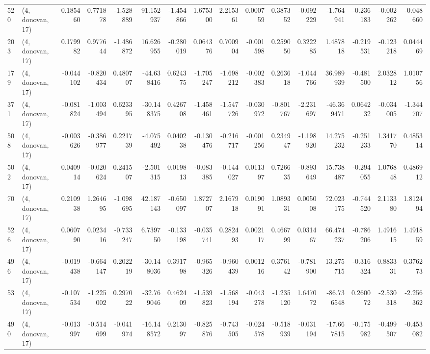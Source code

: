 \begin{tabular}{llrrrrrrrrrrrrrr}
520 &  (4, donovan, 17) &   0.185460 &  0.771878 & -1.528889 &   91.152937 & -1.454866 &   1.675300 &  2.215361 &  0.000759 &  0.387352 & -0.092229 &   -1.764941 & -0.236183 & -0.002262 & -0.048660 \\
203 &  (4, donovan, 17) &   0.179982 &  0.977644 & -1.486872 &   16.626955 & -0.280019 &   0.064376 &  0.700904 & -0.001598 &  0.259050 &  0.322285 &    1.487818 & -0.219531 & -0.123218 &  0.044469 \\
179 &  (4, donovan, 17) &  -0.044102 & -0.820434 &  0.480707 &  -44.638416 &  0.624375 &  -1.705247 & -1.698212 & -0.002383 &  0.263618 & -1.044766 &   36.989939 & -0.481500 &  2.032812 &  1.010756 \\
371 &  (4, donovan, 17) &  -0.081824 & -1.003494 &  0.623395 &  -30.148375 &  0.426708 &  -1.458461 & -1.547726 & -0.030972 & -0.801767 & -2.231697 &  -46.369471 &  0.064232 & -0.034005 & -1.344707 \\
508 &  (4, donovan, 17) &  -0.003626 & -0.386977 &  0.221739 &   -4.075492 &  0.040238 &  -0.130476 & -0.216717 & -0.001256 &  0.234947 & -1.198920 &   14.275232 & -0.251233 &  1.341770 &  0.485314 \\
502 &  (4, donovan, 17) &   0.040914 & -0.020624 &  0.241507 &   -2.501315 &  0.019813 &  -0.083385 & -0.144027 &  0.011397 &  0.726635 & -0.893649 &   15.738487 & -0.294055 &  1.076848 &  0.486912 \\
70  &  (4, donovan, 17) &   0.210938 &  1.264695 & -1.098695 &   42.187143 & -0.650097 &   1.872707 &  2.167918 &  0.019091 &  1.089331 &  0.005008 &   72.023175 & -0.744520 &  2.113380 &  1.812494 \\
526 &  (4, donovan, 17) &   0.060790 &  0.023416 & -0.733247 &    6.739750 & -0.133198 &  -0.035741 &  0.282493 &  0.002117 &  0.466799 &  0.031467 &   66.474237 & -0.786206 &  1.491615 &  1.491859 \\
496 &  (4, donovan, 17) &  -0.019438 & -0.664147 &  0.202219 &  -30.148036 &  0.391798 &  -0.965326 & -0.960439 &  0.001216 &  0.376142 & -0.781900 &   13.275715 & -0.316324 &  0.883331 &  0.376273 \\
53  &  (4, donovan, 17) &  -0.107534 & -1.225002 &  0.297022 &  -32.769046 &  0.462409 &  -1.539823 & -1.568194 & -0.043278 & -1.235120 &  1.647072 &  -86.736548 &  0.260072 & -2.530318 & -2.256362 \\
490 &  (4, donovan, 17) &  -0.013997 & -0.514699 & -0.041974 &  -16.148572 &  0.213097 &  -0.825876 & -0.743505 & -0.024578 & -0.518939 & -0.031194 &  -17.667815 & -0.175982 & -0.499507 & -0.453082 \\

\end{tabular}
